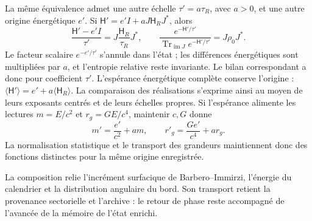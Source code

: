 La même équivalence admet une autre échelle \(\tau'=a\tau_R\), avec \(a>0\), et une autre origine énergétique \(e'\). Si \(\mathsf H'=e'I+aJ\mathsf H_RJ^*\), alors
\[
 \frac{\mathsf H'-e'I}{\tau'}
 =J\frac{\mathsf H_R}{\tau_R}J^*,\qquad
 \frac{e^{-\mathsf H'/\tau'}}
      {\operatorname{Tr}_{\operatorname{im}J}e^{-\mathsf H'/\tau'}}
 =J\rho_0J^*.
\]
Le facteur scalaire \(e^{-e'/\tau'}\) s'annule dans l'état ;
les différences énergétiques sont multipliées par \(a\), et l'entropie
relative reste invariante. Le bilan correspondant a donc
pour coefficient \(\tau'\). L'espérance énergétique complète
conserve l'origine : \(\langle\mathsf H'\rangle
=e'+a\langle\mathsf H_R\rangle\). La comparaison des réalisations
s'exprime ainsi au moyen de leurs exposants centrés et de leurs échelles propres.
Si l'espérance alimente les lectures \(m=E/c^2\) et
\(r_g=GE/c^4\), maintenir \(c,G\) donne
\[
 m'=\frac{e'}{c^2}+am,\qquad
 r'_g=\frac{Ge'}{c^4}+ar_g.
\]
La normalisation statistique et le transport des grandeurs maintiennent donc des fonctions distinctes pour la même origine enregistrée.

La composition relie l'incrément surfacique de Barbero--Immirzi, l'énergie du calendrier et la distribution angulaire du bord. Son transport retient la provenance sectorielle et l'archive : le retour de phase reste accompagné de l'avancée de la mémoire de l'état enrichi.
